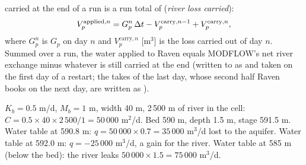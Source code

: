 carried at the end of a run is a run total of  (\emph{river loss carried}):
\begin{equation}
V^{\mathrm{applied},n}_p=G^n_p\,\Delta t-V^{\mathrm{carry},n-1}_p+V^{\mathrm{carry},n}_p,
\end{equation}
where $G^n_p$ is $G_p$ on day $n$ and $V^{\mathrm{carry},n}_p$ [m$^3$] is the loss carried out of day $n$. Summed over a run, the water applied to Raven equals MODFLOW's net
river exchange minus whatever is still carried at the end (written to  as  and
taken on the first day of a restart; the takes of the last day, whose second half Raven books on the next day, are
written as ).
\begin{example}
$K_b=0.5$ m/d, $M_b=1$ m, width 40 m, 2\,500 m of river in the cell: $C=0.5\times40\times2\,500/1=50\,000$ m$^2$/d. Bed
590 m, depth 1.5 m, stage 591.5 m. Water table at 590.8 m: $q=50\,000\times0.7=35\,000$ m$^3$/d lost to the aquifer.
Water table at 592.0 m: $q=-25\,000$ m$^3$/d, a gain for the river. Water table at 585 m (below the bed): the river
leaks $50\,000\times1.5=75\,000$ m$^3$/d.
\end{example}

